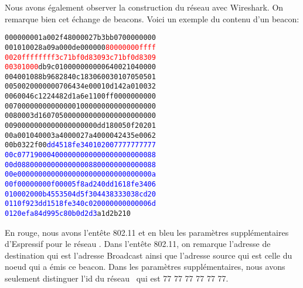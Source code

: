 \begin{enumerate}
            Nous avons également observer la construction du réseau avec Wireshark. On remarque bien cet échange
            de beacons. Voici un exemple du contenu d'un beacon:\\
            \begin{alltt}
0000 00 00 1a 00 2f 48 00 00 27 b3 bb 07 00 00 00 00
0010 10 02 8a 09 a0 00 de 00 00 00 \textcolor{red}{80 00 00 00 ff ff
0020 ff ff ff ff 3c 71 bf 0d 83 09 3c 71 bf 0d 83 09
0030 10 00} db 9c 01 00 00 00 00 00 64 00 21 04 00 00
0040 01 08 8b 96 82 84 0c 18 30 60 03 01 07 05 05 01
0050 02 00 00 00 07 06 43 4e 00 01 0d 14 2a 01 00 32
0060 04 6c 12 24 48 2d 1a 6e 11 00 ff 00 00 00 00 00
0070 00 00 00 00 00 00 01 00 00 00 00 00 00 00 00 00
0080 00 3d 16 07 05 00 00 00 00 00 00 00 00 00 00 00
0090 00 00 00 00 00 00 00 00 00 dd 18 00 50 f2 02 01
00a0 01 04 00 03 a4 00 00 27 a4 00 00 42 43 5e 00 62
00b0 32 2f 00 \textcolor{blue}{dd 45 18 fe 34 01 02 00 77 77 77 77 77
00c0 77 19 00 04 00 00 00 00 00 00 00 00 00 00 00 88
00d0 88 00 00 00 00 00 00 00 88 00 00 00 00 00 00 88
00e0 00 00 00 00 00 00 00 00 00 00 00 00 00 00 00 0a
00f0 00 00 00 0f 00 00 5f 8a d2 40 dd 16 18 fe 34 06
0100 02 00 0b 45 53 50 4d 5f 30 44 38 33 30 38 cd 20
0110 f9 23 dd 15 18 fe 34 0c 02 00 00 00 00 00 00 6d
0120 ef a8 4d 99 5c 80 b0 d2 d3} a1 d2 b2 10
            \end{alltt}

            En rouge, nous avons l'entête 802.11 et en bleu les paramètres supplémentaires
            d'Espressif pour le réseau \espmesh.
            Dans l'entête 802.11, on remarque l'adresse de destination qui est l'adresse Broadcast
            ainsi que l'adresse source qui est celle du noeud qui a émis ce beacon.
            Dans les paramètres supplémentaires, nous avons seulement distinguer l'id du réseau
            \espmesh\ qui est 77 77 77 77 77 77. 
            

        


\end{enumerate}

